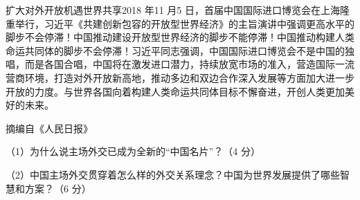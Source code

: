 \documentclass[UTF8,11pt]{ctexart}
\begin{document}
扩大对外开放机遇世界共享2018 年11 月5 日，首届中国国际进口博览会在上海隆重举行，习近平《共建创新包容的开放型世界经济》的主旨演讲中强调更高水平的脚步不会停滞！中国推动建设开放型世界经济的脚步不能停滞！中国推动构建人类命运共同体的脚步不会停滞！习近平同志强调，中国国际进口博览会不是中国的独唱，而是各国合唱，中国将在激发进口潜力，持续放宽市场的准入，营造国际一流营商环境，打造对外开放新高地，推动多边和双边合作深入发展等方面加大进一步开放的力度。与世界各国向着构建人类命运共同体目标不懈奋进，开创人类更加美好的未来。

摘编自《人民日报》

（1）为什么说主场外交已成为全新的“中国名片”？（4 分）


（2）中国主场外交贯穿着怎么样的外交关系理念？中国为世界发展提供了哪些智慧和方案？（6 分）
\end{document}
